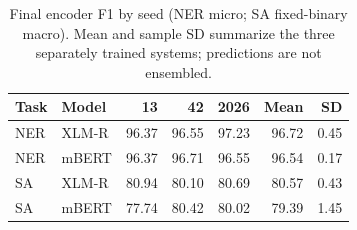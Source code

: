 \begin{table}[t]
\centering\footnotesize
\caption{Final encoder F1 by seed (NER micro; SA fixed-binary macro). Mean and sample SD summarize the three separately trained systems; predictions are not ensembled.}
\label{tab:seeds}
\begin{tabular}{llrrrrr}
\toprule
Task & Model & 13 & 42 & 2026 & Mean & SD\\
\midrule
NER & XLM-R & 96.37 & 96.55 & 97.23 & 96.72 & 0.45\\
NER & mBERT & 96.37 & 96.71 & 96.55 & 96.54 & 0.17\\
SA & XLM-R & 80.94 & 80.10 & 80.69 & 80.57 & 0.43\\
SA & mBERT & 77.74 & 80.42 & 80.02 & 79.39 & 1.45\\
\bottomrule
\end{tabular}
\end{table}
